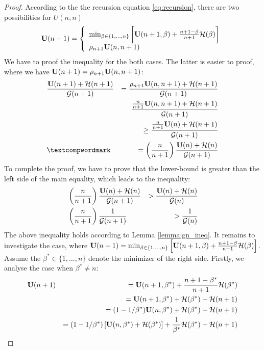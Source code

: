 \documentclass{article}
\begin{document}
\begin{proof}
	According to the the recursion equation \ref{eq:recursion}, there are two
	possibilities for $U(n,n)$
	\begin{equation*} 
	\mathbf U(n+1) = 
\left\{
	\begin{array}{ll}
		\min_{\beta \in \{1,\ldots,n\}} \bigg[\mathbf U(n+1,\beta) + \frac{n+1 - \beta}{n+1}
		{\cal H}(\beta) \bigg]\\
		\rho_{n+1} \mathbf U(n,n+1)
	\end{array}
\right.
\end{equation*}
We have to proof the inequality for the both cases. The latter is easier to
proof, where we have $\mathbf U(n+1) = \rho_{n+1} \mathbf U(n,n+1)$: 
\begin{eqnarray*}
	& \frac{\U(n+1)+\bound(n+1)}{\G(n+1)} &  = 
	\frac{\rho_{n+1} \U(n,n+1)+\bound(n+1)}{\G(n+1)}  \\
	& & \frac{\frac{n}{n+1} \U(n,n+1)+\bound(n+1)}{\G(n+1)} \\ 
	& & \geq  \frac{\frac{n}{n+1} \U(n)+\bound(n+1)}{\G(n+1)} \\
	&‌ & = \left( \frac{n}{n+1}\right) \frac{\U(n)+\bound(n)}{\G(n+1)}
\end{eqnarray*}
To complete the proof, we have to prove that the
lower-bound is greater than the left side of the main equality, which leads to
the inequality:
\begin{eqnarray*}
	& \left( \frac{n}{n+1}\right) \frac{\mathbf U(n)+{\cal H}(n)}{{\cal G}(n+1)} & > 
	\frac{\mathbf U(n)+{\cal H}(n)}{{\cal G}(n)} \\
	& \left( \frac{n}{n+1}\right) \frac{1}{{\cal G}(n+1)} & > 
	\frac{1}{{\cal G}(n)}
\end{eqnarray*}
The above inequality holds according to Lemma \ref{lemma:gn_ineq}. It remains to
investigate the case, where $\mathbf U(n+1) = \min_{\beta \in
\left\{1,\ldots,n\right\}} \left[\mathbf U(n+1,\beta) + \frac{n+1 - \beta}{n+1} {\cal H}(\beta) \right]$. Assume the
$\beta^*  \in \{1,\ldots,n\} $ denote the minimizer of the right side. Firstly, we analyse the case when $\beta^* \neq
		 n $: 
\begin{eqnarray*}
	& \mathbf U(n+1) & = \mathbf U(n+1,\beta^*) + \frac{n+1 - \beta^*}{n+1}
		{\cal H}(\beta^*) \\ 
		&  & = \mathbf U(n+1,\beta^*) + {\cal H}(\beta^*) - {\cal H}(n+1) \\ 
		& & = (1-1/\beta^*) \mathbf U(n,\beta^*) + {\cal H}(\beta^*) - {\cal H}(n+1) \\ 
		& & = (1-1/\beta^*) \left[ \mathbf U(n,\beta^*) + {\cal H}(\beta^*) \right] +
		\frac{1}{\beta^*} {\cal H}(\beta^*) - {\cal H}(n+1)
\end{eqnarray*} 

\end{proof}
\end{document}
